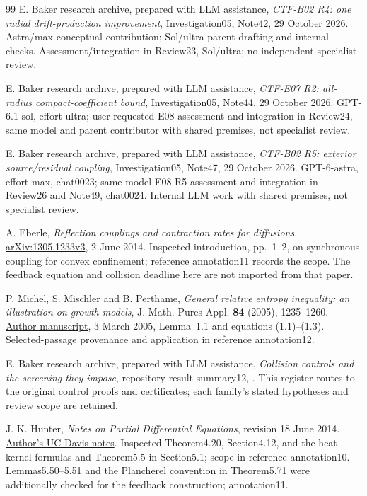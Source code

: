 \documentclass[11pt]{article}
\numberwithin{equation}{section}
\begin{document}
\begin{thebibliography}{99}
E. Baker research archive, prepared with LLM assistance,
\emph{CTF-B02 R4: one radial drift-production improvement},
Investigation05, Note42, 29 October 2026. Astra/max conceptual contribution;
Sol/ultra parent drafting and internal checks. Assessment/integration in
Review23, Sol/ultra; no independent specialist review.

E. Baker research archive, prepared with LLM assistance,
\emph{CTF-E07 R2: all-radius compact-coefficient bound},
Investigation05, Note44, 29 October 2026. GPT-6.1-sol, effort ultra;
user-requested E08 assessment and integration in Review24, same model
and parent contributor with shared premises, not specialist review.

E. Baker research archive, prepared with LLM assistance,
\emph{CTF-B02 R5: exterior source/residual coupling}, Investigation05,
Note47, 29 October 2026. GPT-6-astra, effort max, chat0023;
same-model E08 R5 assessment and integration in Review26 and Note49,
chat0024. Internal LLM work with shared premises, not specialist review.

A. Eberle, \emph{Reflection couplings and contraction rates for diffusions},
\href{https://arxiv.org/abs/1305.1233v3}{arXiv:1305.1233v3}, 2 June 2014.
Inspected introduction, pp.~1--2, on synchronous coupling for convex
confinement; reference annotation11 records the scope. The feedback
equation and collision deadline here are not imported from that paper.

P. Michel, S. Mischler and B. Perthame,
\emph{General relative entropy inequality: an illustration on growth models},
J. Math. Pures Appl. \textbf{84} (2005), 1235--1260.
\href{https://www.ceremade.dauphine.fr/~mischler/articles/41Galentropy.pdf}
{Author manuscript}, 3 March 2005, Lemma~1.1 and equations (1.1)--(1.3).
Selected-passage provenance and application in reference annotation12.

E. Baker research archive, prepared with LLM assistance,
\emph{Collision controls and the screening they impose},
repository result summary12,
.
This register routes to the original control proofs and certificates;
each family's stated hypotheses and review scope are retained.

J. K. Hunter, \emph{Notes on Partial Differential Equations},
revision 18 June 2014.
\href{https://www.math.ucdavis.edu/~hunter/pdes/pde_notes.pdf}
{Author's UC Davis notes}.
Inspected Theorem4.20, Section4.12, and the heat-kernel formulas
and Theorem5.5 in Section5.1; scope in reference annotation10.
Lemmas5.50--5.51 and the Plancherel convention in Theorem5.71
were additionally checked for the feedback construction; annotation11.


\end{thebibliography}
\end{document}
